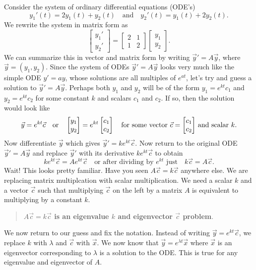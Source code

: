 \begin{example}
Consider the system of ordinary differential equations (ODE's) 
$$y_1'(t)=2y_1(t)+y_2(t)\quad\text{and}\quad y_2'(t) = y_1(t)+2y_2(t).$$  
We rewrite the system in matrix form as 
$$
\begin{bmatrix}y_1'\\y_2'\end{bmatrix} 
= 
\begin{bmatrix}2&1\\1&2\end{bmatrix} 
\begin{bmatrix}y_1\\y_2\end{bmatrix}
.$$ 
We can summarize this in vector and matrix form by writing $\vec y' =A\vec y$, where $\vec y = (y_1,y_2)$. 
Since the system of ODEs $\vec y' =A\vec y$ looks very much like the simple ODE $y'=ay$, whose solutions are all multiples of $e^{at}$, let's try and guess a solution to $\vec y' =A\vec y$.
Perhaps both $y_1$ and $y_2$ will be of the form $y_1 = e^{kt}c_1$ and $y_2=e^{kt}c_2$ for some constant $k$ and scalars $c_1$ and $c_2$.  
If so, then the solution would look like 
$$\vec y = e^{k t} \vec c \quad \text{or}\quad \begin{bmatrix} y_1\\y_2 \end{bmatrix}=e^{k t}\begin{bmatrix} c_1\\c_2 \end{bmatrix} \quad \text{for some vector $\vec c=\begin{bmatrix}c_1\\c_2\end{bmatrix}$ and scalar $k$}.$$  
Now differentiate $\vec y$ which gives  $\vec y ' = k e^{kt}\vec c$. 
Now return to the original ODE $\vec y ' =A\vec y$ and replace $\vec y '$ with its derivative $k e^{kt}\vec c$ to obtain 
$$k e^{k t}\vec c =Ae^{k t}\vec c \quad \text{or after dividing by $e^{kt}$ just}\quad  k \vec c =A\vec c.$$ 
Wait!  This looks pretty familiar.  Have you seen $A\vec c = k\vec c$ anywhere else.  We are replacing matrix multiplcation with scalar multiplication.  We need a scalar $k$ and a vector $\vec c$ such that multiplying $\vec c$ on the left by a matrix $A$ is equivalent to multiplying by a constant $k$. 
\begin{quote}
\textbf{$A\vec c = k\vec c$ is an eigenvalue $k$ and eigenvector $\vec c$ problem}. 
\end{quote} 
We now return to our guess and fix the notation. Instead of writing $\vec y = e^{kt}\vec c$, we replace $k$ with $\lambda$ and $\vec c$ with $\vec x$. We now know that $\vec y = e^{\lambda t}\vec x$ where $\vec x$ is an eigenvector corresponding to $\lambda$ is a solution to the ODE. This is true for any eigenvalue and eigenvector of $A$.


\end{example}
